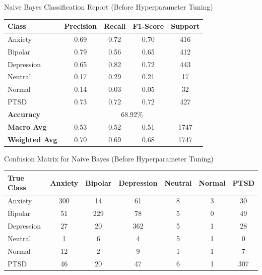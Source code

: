 \begin{center}
    \caption{Naive Bayes Classification Report (Before Hyperparameter Tuning)}
\begin{tabular}{|l|c|c|c|c|}
\hline
\textbf{Class} & \textbf{Precision} & \textbf{Recall} & \textbf{F1-Score} & \textbf{Support} \\ \hline
Anxiety        & 0.69               & 0.72            & 0.70              & 416              \\ \hline
Bipolar        & 0.79               & 0.56            & 0.65              & 412              \\ \hline
Depression     & 0.65               & 0.82            & 0.72              & 443              \\ \hline
Neutral        & 0.17               & 0.29            & 0.21              & 17               \\ \hline
Normal         & 0.14               & 0.03            & 0.05              & 32               \\ \hline
PTSD           & 0.73               & 0.72            & 0.72              & 427              \\ \hline
\textbf{Accuracy} & \multicolumn{4}{|c|}{68.92\%} \\ \hline
\textbf{Macro Avg} & 0.53            & 0.52            & 0.51              & 1747             \\ \hline
\textbf{Weighted Avg} & 0.70         & 0.69            & 0.68              & 1747             \\ \hline
\end{tabular}

\vspace{0.25in}

\caption{Confusion Matrix for Naive Bayes (Before Hyperparameter Tuning)}
\begin{tabular}{|l|c|c|c|c|c|c|}
\hline
\textbf{True Class} & \textbf{Anxiety} & \textbf{Bipolar} & \textbf{Depression} & \textbf{Neutral} & \textbf{Normal} & \textbf{PTSD} \\ \hline
Anxiety             & 300              & 14               & 61                  & 8                & 3               & 30            \\ \hline
Bipolar             & 51               & 229              & 78                  & 5                & 0               & 49            \\ \hline
Depression          & 27               & 20               & 362                 & 5                & 1               & 28            \\ \hline
Neutral             & 1                & 6                & 4                   & 5                & 1               & 0             \\ \hline
Normal              & 12               & 2                & 9                   & 1                & 1               & 7             \\ \hline
PTSD                & 46               & 20               & 47                  & 6                & 1               & 307           \\ \hline
\end{tabular}


\end{center}
